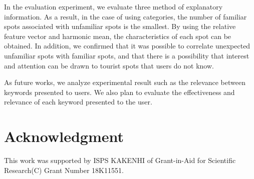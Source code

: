 \documentclass[journal]{IAENGtran}
\begin{document}
In the evaluation experiment, we evaluate three method of explanatory information.
As a result, in the case of using categories, the number of familiar spots associated with unfamiliar spots is the smallest.
By using the relative feature vector and harmonic mean, the characteristics of each spot can be obtained.
In addition, we confirmed that it was possible to correlate unexpected unfamiliar spots with familiar spots, and that there is a possibility that interest and attention can be drawn to tourist spots that users do not know.

As future works, we analyze experimental result such as the relevance between keywords presented to users.
We also plan to evaluate the effectiveness and relevance of each keyword presented to the user.


\section*{Acknowledgment}
This work was supported by ISPS KAKENHI of Grant-in-Aid for Scientific Research(C) Grant Number 18K11551.

\ifCLASSOPTIONcaptionsoff
  \newpage
\fi
\end{document}
